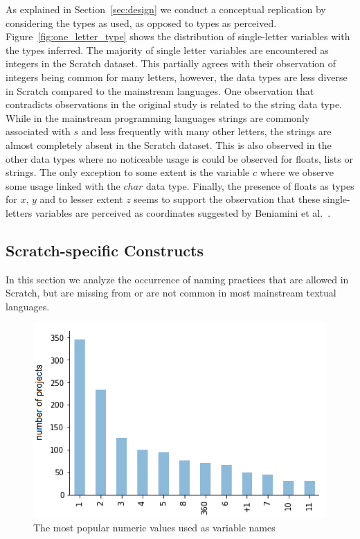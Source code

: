 \documentclass[conference]{IEEEtran}
\begin{document}
As explained in Section~\ref{sec:design} we conduct a conceptual replication by considering the types as used, as opposed to types as perceived.
Figure~\ref{fig:one_letter_type} shows the distribution of single-letter variables with the types inferred. 
The majority of single letter variables are encountered as integers in the Scratch dataset. This partially agrees with their observation of integers being common for many letters, however, the data types  are less diverse in Scratch compared to the mainstream languages.
One observation that contradicts observations in the original study is related to the string data type. While in the mainstream programming languages strings are commonly associated with $s$ and less frequently with many other letters, the strings are almost completely absent in the Scratch dataset. This is also observed in the other data types where no noticeable usage is could be observed for floats, lists or strings. The only exception to some extent is the variable $c$ where we observe some usage linked with the $char$ data type. 
Finally, the presence of floats as types for $x$, $y$ and to lesser extent $z$ seems to support the observation that these single-letters variables are perceived as coordinates suggested by Beniamini et al.~\cite{Beniamini}.

\subsection{Scratch-specific Constructs}
\label{res:Scratch:specific}
In this section we analyze the occurrence of naming practices that are allowed in Scratch, but are missing from or are not common in most mainstream textual languages.
\begin{figure}[!b]
	\begin{center}
		\includegraphics[width=\columnwidth]{fig/project/numeric}
		\caption{The most popular numeric values used as variable names}
		\label{fig:numeric}
	\end{center}
\end{figure} 
\end{document}
